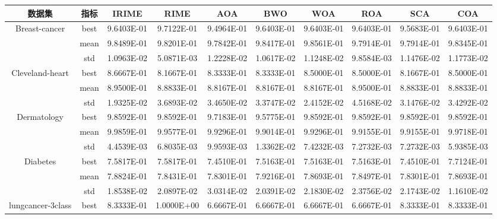 \documentclass{wzuthesis}
\begin{document}
\begin{table}[htbp]
  \centering
    \setlength{\tabcolsep}{3pt} %
    \footnotesize
    \begin{tabular}{cccccccccc}
    \toprule    
    数据集 & 指标 & IRIME & RIME  & AOA   & BWO   & WOA   & ROA   & SCA   & COA \\
    \midrule
    \multirow{3}[0]{*}{Breast-cancer} & best  & 9.6403E-01 & 9.7122E-01 & 9.4964E-01 & 9.6403E-01 & 9.6403E-01 & 9.6403E-01 & 9.5683E-01 & 9.6403E-01 \\
          & mean  & 9.8489E-01 & 9.8201E-01 & 9.7842E-01 & 9.8417E-01 & 9.8561E-01 & 9.7914E-01 & 9.7914E-01 & 9.8345E-01 \\
          & std   & 1.0963E-02 & 5.0871E-03 & 1.2228E-02 & 1.0617E-02 & 1.1248E-02 & 9.8584E-03 & 1.1476E-02 & 1.1773E-02 \\
    \multirow{3}[0]{*}{Cleveland-heart} & best  & 8.6667E-01 & 8.1667E-01 & 8.3333E-01 & 8.3333E-01 & 8.5000E-01 & 8.5000E-01 & 8.1667E-01 & 8.5000E-01 \\
          & mean  & 8.9500E-01 & 8.8833E-01 & 8.8167E-01 & 8.8167E-01 & 8.8167E-01 & 8.9500E-01 & 8.8833E-01 & 8.8833E-01 \\
          & std   & 1.9325E-02 & 3.6893E-02 & 3.4650E-02 & 3.3747E-02 & 2.4152E-02 & 4.5168E-02 & 3.1476E-02 & 3.4292E-02 \\
    \multirow{3}[0]{*}{Dermatology} & best  & 9.8592E-01 & 9.8592E-01 & 9.7183E-01 & 9.5775E-01 & 9.8592E-01 & 9.8592E-01 & 9.8592E-01 & 9.8592E-01 \\
          & mean  & 9.9859E-01 & 9.9577E-01 & 9.9296E-01 & 9.9014E-01 & 9.9296E-01 & 9.9155E-01 & 9.9155E-01 & 9.9718E-01 \\
          & std   & 4.4539E-03 & 6.8035E-03 & 9.9593E-03 & 1.3362E-02 & 7.4232E-03 & 7.2732E-03 & 7.2732E-03 & 5.9385E-03 \\
    \multirow{3}[0]{*}{Diabetes} & best  & 7.5817E-01 & 7.5817E-01 & 7.4510E-01 & 7.5163E-01 & 7.5163E-01 & 7.5163E-01 & 7.4510E-01 & 7.7124E-01 \\
          & mean  & 7.8824E-01 & 7.8431E-01 & 7.8301E-01 & 7.9216E-01 & 7.8693E-01 & 7.8497E-01 & 7.8301E-01 & 7.8693E-01 \\
          & std   & 1.8538E-02 & 2.0897E-02 & 3.0314E-02 & 2.0391E-02 & 2.1830E-02 & 2.3756E-02 & 2.1743E-02 & 1.1610E-02 \\
    \multirow{3}[0]{*}{lungcancer-3class} & best  & 8.3333E-01 & 1.0000E+00 & 6.6667E-01 & 6.6667E-01 & 6.6667E-01 & 6.6667E-01 & 8.3333E-01 & 8.3333E-01 \\

\end{tabular}
\end{table}
\end{document}
